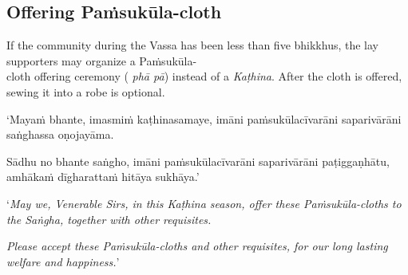
\ifhandbookedition
\vspace*{-\baselineskip}
\enlargethispage{\baselineskip}
\fi

\subsection{Offering Paṁsukūla-cloth}
\label{offering-pamsukula}

If the community during the Vassa has been less than five bhikkhus, the lay
supporters may organize a Paṁsukūla-\\ cloth offering ceremony ( \emph{phā pā})
instead of a \emph{Kaṭhina}. After the cloth is offered, sewing it into a robe
is optional.

\ifhandbookedition
\smallskip
\else
\clearpage
\fi

\begin{paritta}
  ‘Mayaṁ bhante, imasmiṁ kaṭhinasamaye, imāni paṁsukūlacīvarāni saparivārāni
  saṅghassa oṇojayāma.

  Sādhu no bhante saṅgho, imāni paṁsukūlacīvarāni saparivārāni paṭiggaṇhātu,
  amhākaṁ dīgharattaṁ hitāya sukhāya.’
\end{paritta}

‘\emph{May we, Venerable Sirs, in this Kaṭhina season, offer these
  Paṁsukūla-cloths to the Saṅgha, together with other requisites.}

\emph{Please accept these Paṁsukūla-cloths and other requisites, for our long
  lasting welfare and happiness.}’
